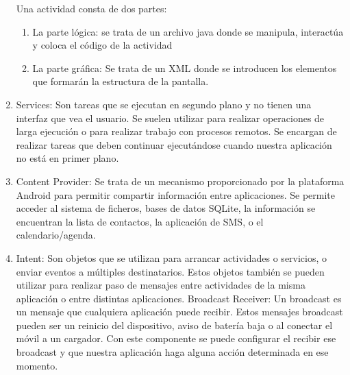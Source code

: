 \begin{enumerate}
Una actividad consta de dos partes:
\begin{enumerate}
\item	La parte lógica: se trata de un archivo java donde se manipula, interactúa y coloca el código de la actividad
\item	La parte gráfica: Se trata de un XML donde se introducen los elementos que formarán la estructura de la pantalla.
\end{enumerate}
\item	Services: Son tareas que se ejecutan en segundo plano y no tienen una interfaz que vea el usuario. Se suelen utilizar para realizar operaciones de larga ejecución o para realizar trabajo con procesos remotos.
Se encargan de realizar tareas que deben continuar ejecutándose cuando nuestra aplicación no está en primer plano.
\item	Content Provider: Se trata de un mecanismo proporcionado por la plataforma Android para permitir compartir información entre aplicaciones. Se permite acceder al sistema de ficheros, bases de datos SQLite, la información se encuentran la lista de contactos, la aplicación de SMS, o el calendario/agenda.  
\item	Intent: Son objetos que se utilizan para arrancar actividades o servicios, o enviar eventos a múltiples destinatarios. Estos objetos también se pueden utilizar para realizar paso de mensajes entre actividades de la misma aplicación o entre distintas aplicaciones.
Broadcast Receiver: Un broadcast es un mensaje que cualquiera aplicación puede recibir. Estos mensajes broadcast pueden ser un reinicio del dispositivo, aviso de batería baja o al conectar el móvil a un cargador. Con este componente se puede configurar el recibir ese broadcast y que nuestra aplicación haga alguna acción determinada en ese momento.
\end{enumerate}
